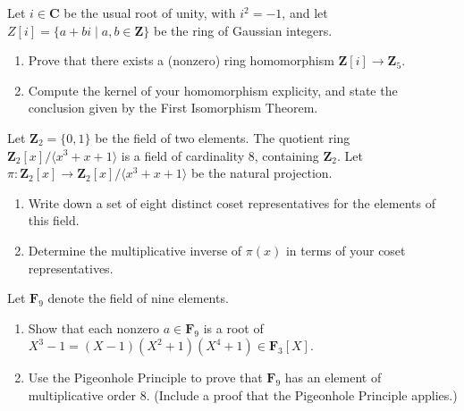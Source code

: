 \documentclass[11pt,twoside,openany]{memoir}
\begin{document}
    \begin{exercise}
    Let $i \in \mathbf{C}$ be the usual root of unity, with $i^2 = -1$, and let $Z[i] = \{a+bi \mid a,b \in \mathbf{Z}\}$ be the ring of Gaussian integers.
    \begin{enumerate}[label = (\arabic*)]
        \item Prove that there exists a (nonzero) ring homomorphism $\mathbf{Z}[i] \rightarrow \mathbf{Z}_5$.
        \item Compute the kernel of your homomorphism explicity, and state the conclusion given by the First Isomorphism Theorem.
    \end{enumerate}
    \end{exercise}
    
    \begin{exercise}
    Let $\mathbf{Z}_2 = \{0,1\}$ be the field of two elements. The quotient ring $\mathbf{Z}_2[x]/\langle x^3+x+1\rangle$ is a field of cardinality 8, containing $\mathbf{Z}_2$. Let $\pi:\mathbf{Z}_2[x] \rightarrow \mathbf{Z}_2[x]/\langle x^3+x+1\rangle$ be the natural projection.
    \begin{enumerate}[label = (\arabic*)]
        \item Write down a set of eight distinct coset representatives for the elements of this field.
        \item Determine the multiplicative inverse of $\pi(x)$ in terms of your coset representatives.
    \end{enumerate}
    \end{exercise}
    
    \begin{exercise}
    Let $\mathbf{F}_9$ denote the field of nine elements.
    \begin{enumerate}[label = (\arabic*)]
        \item Show that each nonzero $a\in \mathbf{F}_9$ is a root of $X^3-1=(X-1)(X^2+1)(X^4+1)\in \mathbf{F}_3[X]$.
        \item Use the Pigeonhole Principle to prove that $\mathbf{F}_9$ has an element of multiplicative order 8. (Include a proof that the Pigeonhole Principle applies.)
    \end{enumerate}
    \end{exercise}
    
\end{document}
